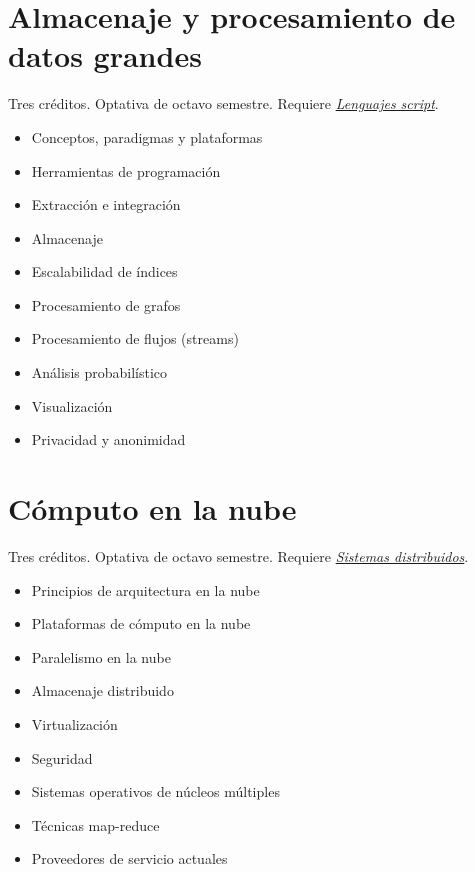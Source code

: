 \documentclass{article}
\begin{document}
\begin{multicols}{4}
\hypertarget{ayp}{\section*{Almacenaje y procesamiento de datos grandes}}

Tres cr\'{e}ditos.
Optativa de octavo semestre. Requiere
\hyperlink{ls}{\em Lenguajes script}.

\begin{itemize}
\item{Conceptos, paradigmas y plataformas}
\item{Herramientas de programaci\'{o}n}
\item{Extracci\'{o}n e integraci\'{o}n}
\item{Almacenaje}
\item{Escalabilidad de \'{i}ndices}
\item{Procesamiento de grafos}
\item{Procesamiento de flujos (streams)}
\item{An\'{a}lisis probabil\'{i}stico}
\item{Visualizaci\'{o}n}
\item{Privacidad y anonimidad}
\end{itemize}

\vfill\null \columnbreak

\hypertarget{celn}{\section*{C\'{o}mputo en la nube}} 

Tres cr\'{e}ditos. Optativa de octavo semestre. Requiere
\hyperlink{sdi}{\em Sistemas distribuidos}.

\begin{itemize}
\item{Principios de arquitectura en la nube}
\item{Plataformas de c\'{o}mputo en la nube}
\item{Paralelismo en la nube}
\item{Almacenaje distribuido}
\item{Virtualizaci\'{o}n}
\item{Seguridad}
\item{Sistemas operativos de n\'{u}cleos m\'{u}ltiples}
\item{T\'{e}cnicas map-reduce}
\item{Proveedores de servicio actuales}
\end{itemize}

\end{multicols}
\newpage
\end{document}

